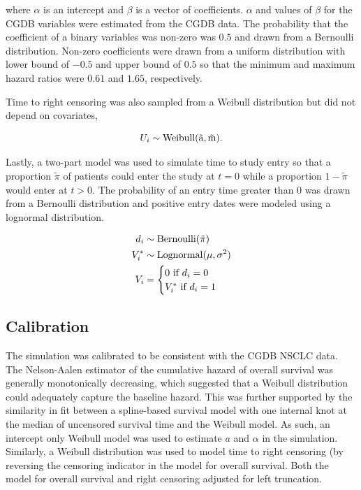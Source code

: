 \documentclass[11pt,final,fleqn]{article}\usepackage[]{graphicx}\usepackage[]{color}
\theoremstyle{plain}
\begin{document}
where $\alpha$ is an intercept and $\beta$ is a vector of coefficients. $\alpha$ and values of $\beta$ for the CGDB variables were estimated from the CGDB data. The probability that the coefficient of a binary variables was non-zero was $0.5$ and drawn from a Bernoulli distribution. Non-zero coefficients were drawn from a uniform distribution with lower bound of $-0.5$ and upper bound of $0.5$ so that the minimum and maximum hazard ratios were $0.61$ and $1.65$, respectively. 

Time to right censoring was also sampled from a Weibull distribution but did not depend on covariates, 

\begin{equation} 
U_i \sim \rm{Weibull}(\tilde{a}, \tilde{m}).
\end{equation} 

Lastly, a two-part model was used to simulate time to study entry so that a proportion $\tilde{\pi}$ of patients could enter the study at $t=0$ while a proportion $1-\tilde{\pi}$ would enter at $t>0$. The probability of an entry time greater than $0$ was drawn from a Bernoulli distribution and positive entry dates were modeled using a lognormal distribution. 

\begin{align}
d_i &\sim \rm{Bernoulli}(\tilde{\pi}) \\
V_i^{*} &\sim \rm{Lognormal}(\mu, \sigma^2) \\
V_i &=\begin{cases}
 0  \text{ if } d_i = 0\\
  V_i^{*}  \text{ if } d_i = 1
  \end{cases}
\end{align}

\subsection{Calibration} \label{subsec:sim-calibration}
The simulation was calibrated to be consistent with the CGDB NSCLC data. The Nelson-Aalen estimator of the cumulative hazard of overall survival was generally monotonically decreasing, which suggested that a Weibull distribution could adequately capture the baseline hazard. This was further supported by the similarity in fit between a spline-based survival model with one internal knot at the median of uncensored survival time and the Weibull model. As such, an intercept only Weibull model was used to estimate $a$ and $\alpha$ in the simulation. Similarly, a Weibull distribution was used to model time to right censoring (by reversing the censoring indicator in the model for overall survival. Both the model for overall survival and right censoring adjusted for left truncation. 
\end{document}
